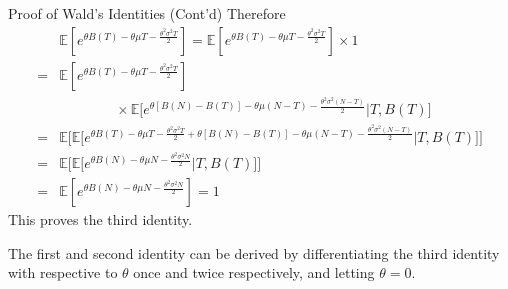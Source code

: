 \documentclass[letterpaper,handout]{beamer}
\def\E{\mathbb E}
\begin{document}
\begin{frame}{Proof of Wald's Identities (Cont'd)}
Therefore
\begin{align*}
&\E[e^{\theta B(T)-\theta\mu T-\frac{\theta^2\sigma^2T}{2}}]=\E[e^{\theta B(T)-\theta\mu T-\frac{\theta^2\sigma^2T}{2}}]\times 1\\
={}&\E[e^{\theta B(T)-\theta\mu T-\frac{\theta^2\sigma^2T}{2}}]\\
&\qquad\qquad\times\E\Big[e^{\theta [B(N)-B(T)]-\theta\mu(N-T)-\frac{\theta^2\sigma^2(N-T)}{2}}\Big|T, B(T)\Big]\\
={}&\E\Big[\E\Big[e^{\theta B(T)-\theta\mu T-\frac{\theta^2\sigma^2T}{2}
        +\theta [B(N)-B(T)]-\theta\mu(N-T)-\frac{\theta^2\sigma^2(N-T)}{2}}\Big|T, B(T)\Big]\Big]\\
={}&\E\Big[\E\Big[e^{\theta B(N)-\theta\mu N-\frac{\theta^2\sigma^2N}{2}}\Big|T, B(T)\Big]\Big]\\
={}&\E[e^{\theta B(N)-\theta\mu N-\frac{\theta^2\sigma^2N}{2}}]=1
\end{align*}
This proves the third identity.\par
The first and second identity can be derived by differentiating the third identity with respective to $\theta$ once and twice respectively, and letting $\theta=0$.
\end{frame}
\end{document}
